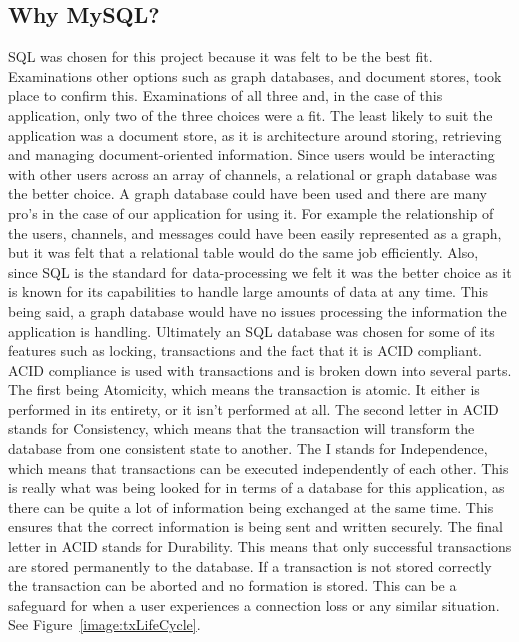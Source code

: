 \subsection{Why MySQL?}
SQL was chosen for this project because it was felt to be the best fit. Examinations other options such as graph databases, and document stores, took place to confirm this. Examinations of all three and, in the case of this application, only two of the three choices were a fit. The least likely to suit the application was a document store, as it is architecture around storing, retrieving and managing document-oriented information. Since users would be interacting with other users across an array of channels, a relational or graph database was the better choice.  A graph database could have been used and there are many pro’s in the case of our application for using it. For example the relationship of the users, channels, and messages could have been easily represented as a graph, but it was felt that a relational table would do the same job efficiently. Also, since SQL is the standard for data-processing we felt it was the better choice as it is known for its capabilities to handle large amounts of data at any time. This being said, a graph database would have no issues processing the information the application is handling. Ultimately an SQL database was chosen for some of its features such as locking, transactions and the fact that it is ACID compliant.
\\ ACID compliance is used with transactions and is broken down into several parts. The first being Atomicity, which means the transaction is atomic. It either is performed in its entirety, or it isn’t performed at all. The second letter in ACID stands for Consistency, which means that the transaction will transform the database from one consistent state to another. The I stands for Independence, which means that transactions can be executed independently of each other. This is really what was being looked for in terms of a database for this application, as there can be quite a lot of information being exchanged at the same time. This ensures that the correct information is being sent and written securely. The final letter in ACID stands for Durability. This means that only successful transactions are stored permanently to the database. If a transaction is not stored correctly the transaction can be aborted and no formation is stored. This can be a safeguard for when a user experiences a connection loss or any similar situation. See Figure~\ref{image:txLifeCycle}.

